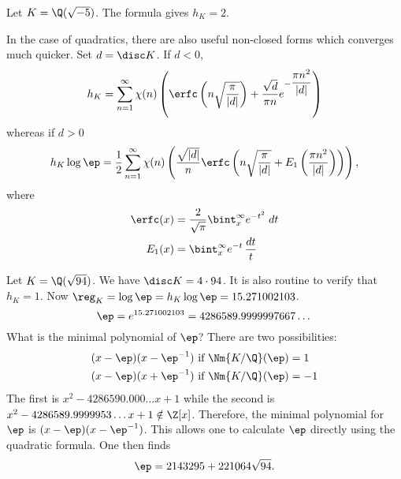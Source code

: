 \begin{ex}
Let $K=\Q(\sqrt{-5})$. The formula gives $h_K=2$. \xqed
\end{ex}

In the case of quadratics, there are also useful non-closed forms which converges much quicker. Set $d=\disc K$. If $d<0$,
	\[
	h_K= \sum_{n=1}^\infty \chi(n) \left( \erfc\left(n \sqrt{\dfrac{\pi}{|d|}} \right) + \dfrac{\sqrt{d}}{\pi n} e^{-\dfrac{\pi n^2}{|d|}} \right)
	\]
whereas if $d>0$
	\[
	h_K\log \ep= \dfrac{1}{2} \sum_{n=1}^\infty \chi(n) \left( \dfrac{\sqrt{|d|}}{n} \erfc \left( n \sqrt{\dfrac{\pi}{|d|}} + E_1\left( \dfrac{\pi n^2}{|d|}\right) \right) \right),
	\]
where
	\[
	\begin{split}
	\erfc(x)&= \dfrac{2}{\sqrt{\pi}} \bint_x^\infty e^{-t^2} \; dt \\
	E_1(x)&= \bint_x^\infty e^{-t} \, \dfrac{dt}{t}
	\end{split}
	\]


\begin{ex}
Let $K=\Q(\sqrt{94})$. We have $\disc K=4 \cdot 94$. It is also routine to verify that $h_K=1$. Now $\reg_K= \log \ep = h_K \log \ep= 15.271002103$.
	\[
	\ep= e^{15.271002103} = 4286589.9999997667\dots
	\]
What is the minimal polynomial of $\ep$? There are two possibilities: 
	\[
	\begin{split}
	(x-\ep)(x- \ep^{-1})& \text{ if }\Nm{K/\Q}(\ep)=1 \\
	(x-\ep)(x+\ep^{-1})& \text{ if }\Nm{K/\Q}(\ep)= -1 
	\end{split}
	\]
The first is $x^2-4286590.000\dots x+1$ while the second is $x^2-4286589.9999953\dots x+1 \notin \Z[x]$. Therefore, the minimal polynomial for $\ep$ is $(x-\ep)(x- \ep^{-1})$. This allows one to calculate $\ep$ directly using the quadratic formula. One then finds
	\[
	\ep = 2143295 + 221064 \sqrt{94}.
	\] \xqed
\end{ex}





















